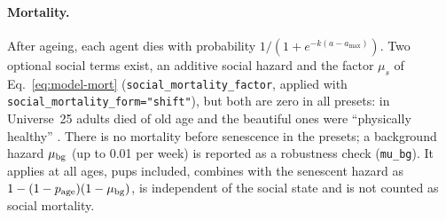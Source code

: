 \paragraph{Mortality.}
After ageing, each agent dies with probability $1/(1+e^{-k(a-a_{\max})})$.
Two optional social terms exist, an additive social hazard and the factor $\mu_s$ of
Eq.~\eqref{eq:model-mort} (\texttt{social\_mortality\_factor}, applied with \texttt{social\_mortality\_form="shift"}),
but both are zero in all presets: in Universe~25 adults died of old
age and the beautiful ones were ``physically healthy'' \cite{Calhoun1973}. There is no mortality before senescence in
the presets; a background hazard $\mu_{\rm bg}$ (up to 0.01 per week) is reported as a robustness check
(\texttt{mu\_bg}). It applies at all ages, pups included, combines with the senescent hazard as
$1-(1-p_{\rm age})(1-\mu_{\rm bg})$, is independent of the social state and is not counted as social mortality.

